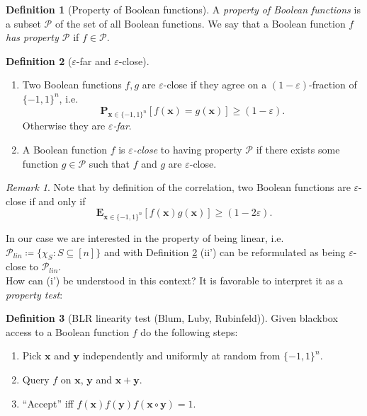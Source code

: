 \documentclass[a4paper]{article}
\newcommand{\prob}{\mathbf{P}}
\newcommand{\expe}{\mathbf{E}}
\newcommand{\prty}{\mathcal{P}}
\newcommand{\nset}{[n]}
\newcommand{\eps}{\varepsilon}
\newcommand{\boldx}{\boldsymbol{x}}
\newcommand{\boldy}{\boldsymbol{y}}
\theoremstyle{plain}
\theoremstyle{definition}
\newtheorem{definition}{Definition}
\theoremstyle{remark}
\newtheorem*{remark*}{Remark}
\begin{document}
\begin{definition}[Property of Boolean functions] \label{def:2}
  A \emph{property of Boolean functions} is a subset \(\prty\) of the
  set of all Boolean functions. We say that a Boolean function \(f\) \emph{has property \(\prty\)} if \(f
  \in \prty\). 
\end{definition}

\begin{definition}[\(\eps\)-far and \(\eps\)-close] \label{def:3}
  \begin{enumerate}[label=(\roman*)]
  \item Two Boolean functions \(f,g\) are \(\eps\)-close if they agree
    on a \((1-\eps)\)-fraction of \(\{-1,1\}^n\), i.e. 
    \[\prob_{\boldx\in\{-1,1\}^n}\left[f(\boldx) = g(\boldx)\right] \geq (1-\eps).\]
    Otherwise they are \emph{\(\eps\)-far}. 
  \item A Boolean function \(f\) is \emph{\(\eps\)-close} to having property
    \(\prty\) if there exists some function \(g\in \prty\) such that
    \(f\) and \(g\) are \(\eps\)-close. 
  \end{enumerate}
\end{definition}

\begin{remark*}
  Note that by definition of the correlation, two Boolean functions
  are \(\eps\)-close if and only if 
  \[\expe_{\boldx \in \{-1,1\}^n}\left[f(\boldx)g(\boldx)\right] \geq
  (1- 2\eps).\]  
\end{remark*}

\noindent In our case we are interested in the property of being
linear, i.e. \(\prty_{lin} \coloneqq \{\chi_S: S \subseteq
\nset\}\) and with Definition \ref{def:3} (ii') can be reformulated as
being \(\eps\)-close to \(\prty_{lin}\). \\

\noindent How can (i') be understood in this context? It is favorable to
interpret it as a \emph{property test}: 

\begin{definition}[\textsf{BLR} linearity test (Blum, Luby,
  Rubinfeld)] \label{def:4}
  Given blackbox access to a Boolean function \(f\) do the following
  steps: 
  \begin{enumerate}
  \item Pick \(\boldx\) and \(\boldy\) independently and uniformly at random
    from \(\{-1,1\}^n\).
  \item Query \(f\) on \(\boldx\), \(\boldy\) and \(\boldx+\boldy\).
  \item ``Accept'' iff \(f(\boldx)f(\boldy)f(\boldx \circ \boldy) = 1\). 
  \end{enumerate}
\end{definition}
\end{document}
